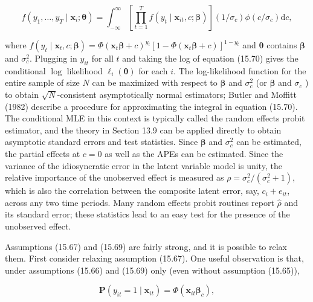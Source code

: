 \documentclass[10pt]{article}
\begin{document}
\begin{equation*}
f\left(y_{1}, \ldots, y_{T} \mid \mathbf{x}_{i} ; \boldsymbol{\theta}\right)=\int_{-\infty}^{\infty}\left[\prod_{t=1}^{T} f\left(y_{t} \mid \mathbf{x}_{i t}, c ; \boldsymbol{\beta}\right)\right]\left(1 / \sigma_{c}\right) \phi\left(c / \sigma_{c}\right) \mathrm{d} c, \tag{15.70}
\end{equation*}


where $f\left(y_{t} \mid \mathbf{x}_{t}, c ; \boldsymbol{\beta}\right)=\Phi\left(\mathbf{x}_{t} \boldsymbol{\beta}+c\right)^{y_{t}}\left[1-\Phi\left(\mathbf{x}_{t} \boldsymbol{\beta}+c\right)\right]^{1-y_{t}}$ and $\boldsymbol{\theta}$ contains $\boldsymbol{\beta}$ and $\sigma_{c}^{2}$. Plugging in $y_{i t}$ for all $t$ and taking the log of equation (15.70) gives the conditional $\log$ likelihood $\ell_{i}(\boldsymbol{\theta})$ for each $i$. The log-likelihood function for the entire sample of size $N$ can be maximized with respect to $\boldsymbol{\beta}$ and $\sigma_{c}^{2}$ (or $\boldsymbol{\beta}$ and $\sigma_{c}$ ) to obtain $\sqrt{N}$-consistent asymptotically normal estimators; Butler and Moffitt (1982) describe a procedure for approximating the integral in equation (15.70). The conditional MLE in this context is typically called the random effects probit estimator, and the theory in Section 13.9 can be applied directly to obtain asymptotic standard errors and test statistics. Since $\boldsymbol{\beta}$ and $\sigma_{c}^{2}$ can be estimated, the partial effects at $c=0$ as well as the APEs can be estimated. Since the variance of the idiosyncratic error in the latent variable model is unity, the relative importance of the unobserved effect is measured as $\rho= \sigma_{c}^{2} /\left(\sigma_{c}^{2}+1\right)$, which is also the correlation between the composite latent error, say, $c_{i}+e_{i t}$, across any two time periods. Many random effects probit routines report $\hat{\rho}$ and its standard error; these statistics lead to an easy test for the presence of the unobserved effect.

Assumptions (15.67) and (15.69) are fairly strong, and it is possible to relax them. First consider relaxing assumption (15.67). One useful observation is that, under assumptions (15.66) and (15.69) only (even without assumption (15.65)),


\begin{equation*}
\mathbf{P}\left(y_{i t}=1 \mid \mathbf{x}_{i t}\right)=\Phi\left(\mathbf{x}_{i t} \boldsymbol{\beta}_{c}\right), \tag{15.71}
\end{equation*}
\end{document}

